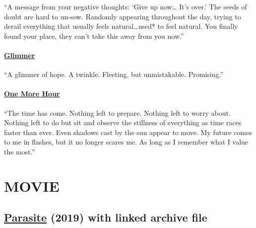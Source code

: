 \documentclass[
]{article}
\begin{document}
``A message from your negative thoughts: `Give up now\ldots{} It's
over.' The seeds of doubt are hard to un-sow. Randomly appearing
throughout the day, trying to derail everything that usually feels
natural\ldots*used* to feel natural. You finally found your place, they
can't take this away from you now.''

\paragraph{\texorpdfstring{\href{https://open.spotify.com/track/1unBUyjeQUDiJ8N89XiDrr?si=20ab8160313043fe}{\textbf{Glimmer}}}{Glimmer}}\label{glimmer}

``A glimmer of hope. A twinkle. Fleeting, but unmistakable. Promising.''

\paragraph{\texorpdfstring{\href{https://open.spotify.com/track/0mO6oS60RST2sWmN2FKknP?si=34c2bee3c5884763}{\textbf{One
More Hour}}}{One More Hour}}\label{one-more-hour}

``The time has come. Nothing left to prepare. Nothing left to worry
about. Nothing left to do but sit and observe the stillness of
everything as time races faster than ever. Even shadows cast by the sun
appear to move. My future comes to me in flashes, but it no longer
scares me. As long as I remember what I value the most.''

\section{MOVIE}\label{movie}

\subsection{\texorpdfstring{\href{https://archive.org/details/parasite.-2019.1080p.-black.and.-white.-brrip.-aac.-h-265.-fgn}{Parasite}
(2019) with linked archive
file}{Parasite (2019) with linked archive file}}\label{parasite-2019-with-linked-archive-file}
\end{document}
